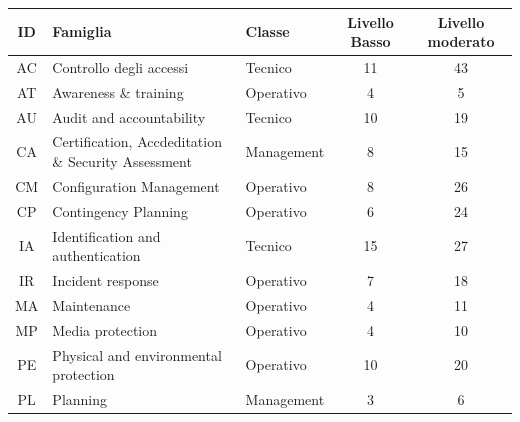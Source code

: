 \documentclass[../main.tex]{subfiles}
\begin{document}
\begin{table}[h]
    \begin{tabulary}{\textwidth}{|C|L|L|C|C|}
    \hline
    \textbf{ID}   & \textbf{Famiglia}                                   & \textbf{Classe} & \textbf{Livello Basso} & \textbf{Livello moderato} \\ \hline
    AC            & Controllo degli accessi                             & Tecnico         & 11                     & 43                        \\ \hline
    AT            & Awareness \& training                               & Operativo       & 4                      & 5                        \\ \hline
    AU            & Audit and accountability                            & Tecnico         & 10                     & 19                        \\ \hline
    CA            & Certification, Accdeditation \& Security Assessment & Management      & 8                      & 15                        \\ \hline
    CM            & Configuration Management                            & Operativo       & 8                      & 26                        \\ \hline
    CP            & Contingency Planning                                & Operativo       & 6                      & 24                        \\ \hline
    IA            & Identification and authentication                   & Tecnico         & 15                     & 27                        \\ \hline
    IR            & Incident response                                   & Operativo       & 7                      & 18                        \\ \hline
    MA            & Maintenance                                         & Operativo       & 4                      & 11                        \\ \hline
    MP            & Media protection                                    & Operativo       & 4                      & 10                        \\ \hline
    PE            & Physical and environmental protection               & Operativo       & 10                     & 20                        \\ \hline
    PL            & Planning                                            & Management      & 3                      & 6                         \\ \hline

\end{tabulary}
\end{table}
\end{document}
